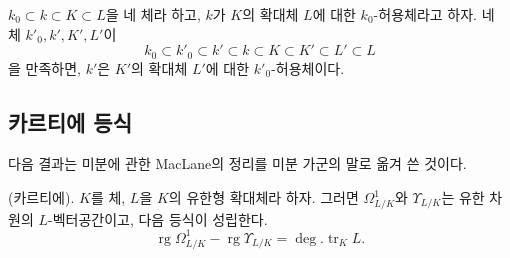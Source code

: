 \begin{corollary}[21.6.6]
\label{0.21.6.6-ko}
$k_0\subset k\subset K\subset L$을 네 체라 하고, $k$가 $K$의 확대체
$L$에 대한 $k_0$-허용체라고 하자. 네 체 $k'_0,k',K',L'$이
\[
k_0\subset k'_0\subset k'\subset k\subset K\subset K'\subset L'
\subset L
\]
을 만족하면, $k'$은 $K'$의 확대체 $L'$에 대한 $k'_0$-허용체이다.
\end{corollary}

\subsection{카르티에 등식}
\label{subsection:0.21.7-ko}

다음 결과는 미분에 관한 MacLane의 정리를 미분 가군의 말로 옮겨 쓴
것이다.

\begin{theorem}[21.7.1]
\label{0.21.7.1-ko}
\textnormal{(카르티에).}
$K$를 체, $L$을 $K$의 유한형 확대체라 하자. 그러면
$\Omega^1_{L/K}$와 $\Upsilon_{L/K}$는 유한 차원의 $L$-벡터공간이고,
다음 등식이 성립한다.
\begin{equation}
\tag{21.7.1.1}
\label{0.21.7.1.1-ko}
\operatorname{rg}\Omega^1_{L/K}-\operatorname{rg}\Upsilon_{L/K}
=\deg.\operatorname{tr}_K L.
\end{equation}
\end{theorem}

